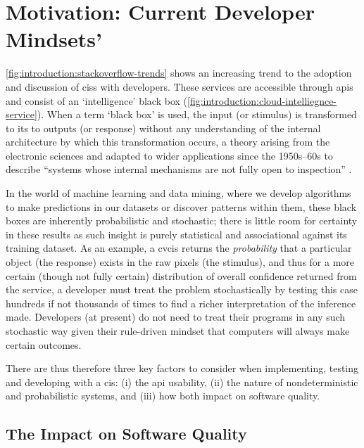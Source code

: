 \section{Motivation: Current Developer Mindsets'}
\label{sec:introduction:motivation}

\cref{fig:introduction:stackoverflow-trends} shows an increasing trend to the adoption and discussion of \glspl{cis} with developers. These services are accessible through \glspl{api} and consist of an `intelligence' black box (\cref{fig:introduction:cloud-intelliegnce-service}). When a term `black box' is used, the input (or stimulus) is transformed to its to outputs (or response) without any understanding of the internal architecture by which this transformation occurs, a theory arising from the electronic sciences and adapted to wider applications since the 1950s--60s \citep{Ashby:1957db,Bunge:1963jm} to describe ``systems whose internal mechanisms are not fully open to inspection'' \citep{Ashby:1957db}. 

In the world of machine learning and data mining, where we develop algorithms to make predictions in our datasets or discover patterns within them, these black boxes are inherently probabilistic and stochastic; there is little room for certainty in these results as such insight is purely statistical and associational \citep{Pearl:2018uv} against its training dataset. As an example, a \gls{cvcis} returns the \textit{probability} that a particular object (the response) exists in the raw pixels (the stimulus), and thus for a more certain (though not fully certain) distribution of overall confidence returned from the service, a developer must treat the problem stochastically by testing this case hundreds if not thousands of times to find a richer interpretation of the inference made. Developers (at present) do not need to treat their programs in any such stochastic way given their rule-driven mindset that computers will always make certain outcomes.

There are thus therefore three key factors to consider when implementing, testing and developing with a \gls{cis}: (i) the \gls{api} usability, (ii) the nature of nondeterministic and probabilistic systems, and (iii) how both impact on software quality.

\subsection{The Impact on Software Quality}
\label{ssec:introduction:motivation:impact}

